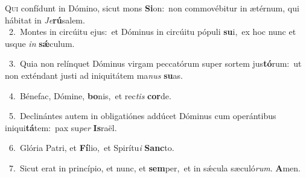 \lettrine{\initial\textcolor{\initialcolor}{Q}}{ui} confídunt in Dómino, sicut mons \textbf{Si}\-on:~\star non commovébitur in ætérnum, qui hábitat in \textit{Je}\-\textbf{rú}salem.\\
{\numbfont\textcolor{\numbcolor}{~2.}}~Montes in circúitu ejus:~\dagger et Dóminus in circúitu pópuli \textbf{su}\-i,~\star ex hoc nunc et usque \textit{in} \textbf{sǽ}\-culum.\par
{\numbfont\textcolor{\numbcolor}{~3.}}~Quia non relínquet Dóminus virgam peccatórum super sortem jus\-\textbf{tó}\-rum:~\star ut non exténdant justi ad iniquitátem ma\textit{nus} \textbf{su}\-as.\par
{\numbfont\textcolor{\numbcolor}{~4.}}~Bénefac, Dómine, \textbf{bo}\-nis,~\star et rec\textit{tis} \textbf{cor}\-de.\par
{\numbfont\textcolor{\numbcolor}{~5.}}~Declinántes autem in obligatiónes addúcet Dóminus cum operántibus iniqui\-\textbf{tá}\-tem:~\star pax su\textit{per} \textbf{Is}\-raël.\par
{\numbfont\textcolor{\numbcolor}{~6.}}~Glória Patri, et \textbf{Fí}\-lio,~\star et Spirítu\textit{i} \textbf{Sanc}\-to.\par
{\numbfont\textcolor{\numbcolor}{~7.}}~Sicut erat in princípio, et nunc, et \textbf{sem}\-per,~\star et in sǽcula sæculó\-\textit{rum}\-. \textbf{A}\-men.\par
